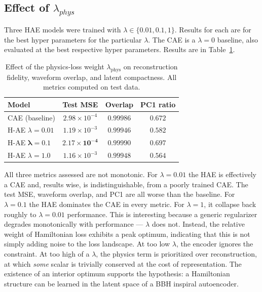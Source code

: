 \documentclass[conference]{IEEEtran}
\begin{document}
\subsection{Effect of $\lambda_{phys}$}
Three HAE models were trained with $\lambda \in \{0.01, 0.1, 1\}$. Results for each are for the best hyper parameters for the particular $\lambda$. The CAE is a $\lambda = 0$ baseline, also evaluated at the best respective hyper parameters. Results are in Table~\ref{tab:lambda_sweep}.

\begin{table}[H]
    \centering
    \small
    \caption{Effect of the physics-loss weight $\lambda_{\text{phys}}$ on reconstruction fidelity, waveform overlap, and latent compactness. All metrics computed on test data.}
    \label{tab:lambda_sweep}
    \begin{tabular}{lccc}
        \toprule
        Model & Test MSE  & Overlap  & PC1 ratio \\
        \midrule
        CAE (baseline)               & $2.98 \times 10^{-4}$ & $0.99986$            & $0.672$ \\
        \midrule
        H-AE  $\lambda{=}0.01$       & $1.19 \times 10^{-3}$ & $0.99946$            & $0.582$ \\
        H-AE  $\mathbf{\lambda{=}0.1}$        & $\mathbf{2.17 \times 10^{-4}}$ & $\mathbf{0.99990}$ & $\mathbf{0.697}$ \\
        H-AE  $\lambda{=}1.0$        & $1.16 \times 10^{-3}$ & $0.99948$            & $0.564$ \\
        \bottomrule
    \end{tabular}
\end{table}

All three metrics assessed are not monotonic. For $\lambda=0.01$ the HAE is effectively a CAE and, results wise, is indistinguishable, from a poorly trained CAE. The test MSE, waveform overlap, and PC1 are all worse than the baseline.
For $\lambda=0.1$ the HAE dominates the CAE in every metric. For $\lambda = 1$, it collapse back roughly to $\lambda=0.01$ performance. This is interesting because a generic regularizer degrades monotonically with performance --- $\lambda$ does not.
Instead, the relative weight of Hamiltonian loss exhibits a peak optimum, indicating that this is not simply adding noise to the loss landscape. At too low $\lambda$, the encoder ignores the constraint. At too high of a $\lambda$, the physics term is prioritized over reconstruction, at which \textit{some} scalar is trivially conserved at the cost of representation. The existence of an interior optimum supports the hypothesis: a Hamiltonian structure can be learned in the latent space of a BBH inspiral autoencoder.
\end{document}
